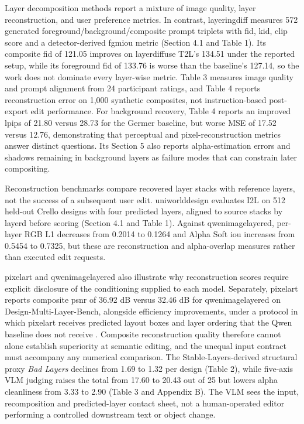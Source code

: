 Layer decomposition methods report a mixture of image quality, layer reconstruction, and user preference metrics.
In contrast, \ac{layeringdiff} measures 572 generated foreground/background/composite prompt triplets with \ac{fid}, \ac{kid}, \ac{clip} score and a detector-derived \ac{fgmiou} metric (Section 4.1 and Table 1).
Its composite \ac{fid} of 121.05 improves on \ac{layerdiffuse} T2L's 134.51 under the reported setup, while its foreground \ac{fid} of 133.76 is worse than the baseline's 127.14, so the work does not dominate every layer-wise metric.
Table 3 measures image quality and prompt alignment from 24 participant ratings, and Table 4 reports reconstruction error on 1,000 synthetic composites, not instruction-based post-export edit performance.
For background recovery, Table 4 reports an improved \ac{lpips} of 21.80 versus 28.73 for the Germer baseline, but worse MSE of 17.52 versus 12.76, demonstrating that perceptual and pixel-reconstruction metrics answer distinct questions.
Its Section 5 also reports alpha-estimation errors and shadows remaining in background layers as failure modes that can constrain later compositing.

Reconstruction benchmarks compare recovered layer stacks with reference layers, not the success of a subsequent user edit.
\ac{uniworlddesign} evaluates I2L on 512 held-out Crello designs with four predicted layers, aligned to source stacks by \ac{layerd} before scoring (Section 4.1 and Table 1).
Against \ac{qwenimagelayered}, per-layer RGB L1 decreases from 0.2014 to 0.1264 and Alpha Soft \ac{iou} increases from 0.5454 to 0.7325, but these are reconstruction and alpha-overlap measures rather than executed edit requests.

\ac{pixelart} and \ac{qwenimagelayered} also illustrate why reconstruction scores require explicit disclosure of the conditioning supplied to each model.
Separately, \ac{pixelart} reports composite \ac{psnr} of 36.92 dB versus 32.46 dB for \ac{qwenimagelayered} on Design-Multi-Layer-Bench, alongside efficiency improvements, under a protocol in which \ac{pixelart} receives predicted layout boxes and layer ordering that the Qwen baseline does not receive \citep{jia2026pixelart}.
Composite reconstruction quality therefore cannot alone establish superiority at semantic editing, and the unequal input contract must accompany any numerical comparison.
The Stable-Layers-derived structural proxy \emph{Bad Layers} declines from 1.69 to 1.32 per design (Table 2), while five-axis VLM judging raises the total from 17.60 to 20.43 out of 25 but lowers alpha cleanliness from 3.33 to 2.90 (Table 3 and Appendix B).
The VLM sees the input, recomposition and predicted-layer contact sheet, not a human-operated editor performing a controlled downstream text or object change.

